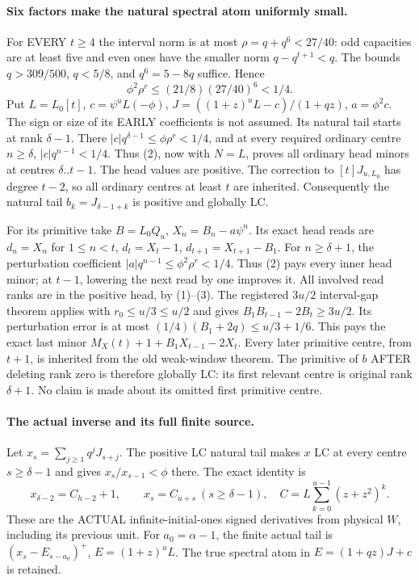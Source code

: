 \paragraph{Six factors make the natural spectral atom uniformly small.}
For EVERY $t\ge4$ the interval norm is at most
$\rho=q+q^6<27/40$: odd capacities are at least five and even
ones have the smaller norm $q-q^{t+1}<q$. The bounds
$q>309/500$, $q<5/8$, and $q^6=5-8q$ suffice. Hence
\[
 \phi^2\rho^r\le(21/8)(27/40)^6<1/4.              \tag{3}
\]
Put $L=L_0[t]$, $c=\psi^uL(-\phi)$,
$J=((1+z)^uL-c)/(1+qz)$, $a=\phi^2c$.
The sign or size of its EARLY coefficients is not assumed.
Its natural tail starts at rank $\delta-1$. There
$|c|q^{\delta-1}\le\phi\rho^r<1/4$, and at every required
ordinary centre $n\ge\delta$,
$|c|q^{n-1}<1/4$. Thus (2), now with $N=L$, proves all ordinary
head minors at centres $\delta..t-1$. The head values are positive.
The correction to $[t]J_{u,L_0}$ has degree $t-2$, so all
ordinary centres at least $t$ are inherited. Consequently the
natural tail $b_k=J_{\delta-1+k}$ is positive and globally LC.

For its primitive take $B=L_0Q_u$, $X_n=B_n-a\psi^n$.
Its exact head reads are
$d_n=X_n$ for $1\le n<t$, $d_t=X_t-1$,
$d_{t+1}=X_{t+1}-B_1$.
For $n\ge\delta+1$, the perturbation coefficient
$|a|q^{n-1}\le\phi^2\rho^r<1/4$. Thus (2) pays every inner
head minor; at $t-1$, lowering the next read by one improves it.
All involved read ranks are in the positive head, by (1)--(3).
The registered $3u/2$ interval-gap theorem applies with
$r_0\le u/3\le u/2$ and gives
$B_1B_{t-1}-2B_t\ge3u/2$.
Its perturbation error is at most
$(1/4)(B_1+2q)\le u/3+1/6$.
This pays the exact last minor
$M_X(t)+1+B_1X_{t-1}-2X_t$.
Every later primitive centre, from $t+1$, is inherited from the
old weak-window theorem. The primitive of $b$ AFTER deleting
rank zero is therefore globally LC: its first relevant centre
is original rank $\delta+1$. No claim is made about its omitted
first primitive centre.

\paragraph{The actual inverse and its full finite source.}
Let $x_s=\sum_{j\ge1}q^jJ_{s+j}$. The positive LC natural tail
makes $x$ LC at every centre $s\ge\delta-1$ and gives
$x_s/x_{s-1}<\phi$ there. The exact identity is
\[
 x_{\delta-2}=C_{h-2}+1,\qquad
 x_s=C_{u+s}\ (s\ge\delta-1),\quad
 C=L\sum_{k=0}^{u-1}(z+z^2)^k.
\]
These are the ACTUAL infinite-initial-ones signed derivatives from
physical $W$, including its previous unit. For $a_0=\alpha-1$,
the finite actual tail is $(x_s-E_{s-a_0})^+$,
$E=(1+z)^uL$. The true spectral atom in
$E=(1+qz)J+c$ is retained.


